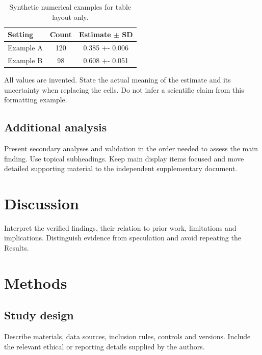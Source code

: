 \documentclass[11pt]{article}
\begin{document}
\begin{table}[htbp]
\centering
\caption{Synthetic numerical examples for table layout only.}
\label{tab:comparison}
\small
\begin{tabularx}{\linewidth}{@{}>{\raggedright\arraybackslash}X
  S[table-format=3.0] S[table-format=1.3(3)]@{}}
\toprule
Setting & {Count} & {Estimate $\pm$ SD}\\
\midrule
Example A & 120 & 0.385 +- 0.006\\
Example B & 98 & 0.608 +- 0.051\\
\bottomrule
\end{tabularx}
\par\smallskip\footnotesize\raggedright
All values are invented. State the actual meaning of the estimate and its
uncertainty when replacing the cells. Do not infer a scientific claim from
this formatting example.
\end{table}

\subsection{Additional analysis}
Present secondary analyses and validation in the order needed to assess the
main finding. Use topical subheadings. Keep main display items focused and
move detailed supporting material to the independent supplementary document.

\section{Discussion}\label{sec:discussion}
Interpret the verified findings, their relation to prior work, limitations
and implications.
Distinguish evidence from speculation and avoid repeating the Results.

\section{Methods}\label{sec:methods}
\subsection{Study design}
Describe materials, data sources, inclusion rules, controls and versions.
Include the relevant ethical or reporting details supplied by the authors.
\end{document}
